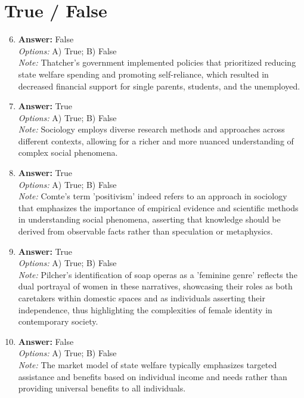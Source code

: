 \documentclass[12pt]{article}
\begin{document}
\section*{True / False}
\begin{enumerate}[label=\arabic*.]
\setcounter{enumi}{5}
\item \textbf{Answer:} False
\\ \textit{Options:} A) True; B) False
\\ \textit{Note:} Thatcher's government implemented policies that prioritized reducing state welfare spending and promoting self-reliance, which resulted in decreased financial support for single parents, students, and the unemployed.
\item \textbf{Answer:} True
\\ \textit{Options:} A) True; B) False
\\ \textit{Note:} Sociology employs diverse research methods and approaches across different contexts, allowing for a richer and more nuanced understanding of complex social phenomena.
\item \textbf{Answer:} True
\\ \textit{Options:} A) True; B) False
\\ \textit{Note:} Comte's term 'positivism' indeed refers to an approach in sociology that emphasizes the importance of empirical evidence and scientific methods in understanding social phenomena, asserting that knowledge should be derived from observable facts rather than speculation or metaphysics.
\item \textbf{Answer:} True
\\ \textit{Options:} A) True; B) False
\\ \textit{Note:} Pilcher's identification of soap operas as a 'feminine genre' reflects the dual portrayal of women in these narratives, showcasing their roles as both caretakers within domestic spaces and as individuals asserting their independence, thus highlighting the complexities of female identity in contemporary society.
\item \textbf{Answer:} False
\\ \textit{Options:} A) True; B) False
\\ \textit{Note:} The market model of state welfare typically emphasizes targeted assistance and benefits based on individual income and needs rather than providing universal benefits to all individuals.
\end{enumerate}
\end{document}
